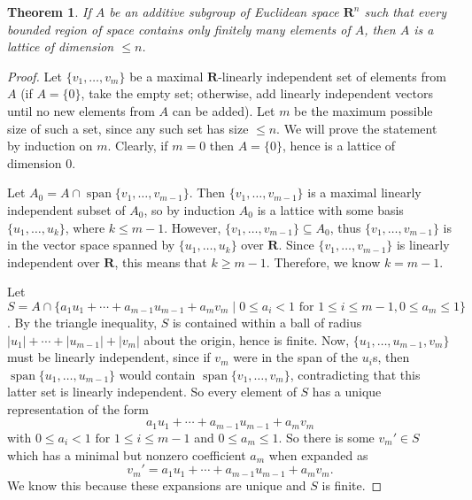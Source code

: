 \documentclass[10pt]{article}
\newcommand{\R}{\mathbf{R}}
\DeclareMathOperator*{\spn}{span}
\newtheorem*{thm}{Theorem}
\begin{document}
\begin{thm}
\normalfont
If $A$ be an additive subgroup of Euclidean space $\R^n$ such that every bounded region of space contains only finitely many elements of $A$, then $A$ is a lattice of dimension $\leq n$.
\end{thm}

\begin{proof}
Let $\{v_1, \dots , v_m\}$ be a maximal $\R$-linearly independent set of elements from $A$ (if $A=\{0\}$, take the empty set; otherwise, add linearly independent vectors until no new elements from $A$ can be added).  Let $m$ be the maximum possible size of such a set, since any such set has size $\leq n$.  We will prove the statement by induction on $m$.  Clearly, if $m = 0$ then $A = \{0\}$, hence is a lattice of dimension $0$.

Let $A_0 = A \cap \spn \{v_1, \dots , v_{m-1}\}$.  Then $\{v_1, \dots , v_{m-1}\}$ is a maximal linearly independent subset of $A_0$, so by induction $A_0$ is a lattice with some basis $\{u_1, \dots , u_k\}$, where $k \leq m-1$.  However, $\{v_1, \dots , v_{m-1}\} \subseteq A_0$, thus $\{v_1, \dots , v_{m-1}\}$ is in the vector space spanned by $\{u_1, \dots , u_k\}$ over $\R$.  Since $\{v_1, \dots , v_{m-1}\}$ is linearly independent over $\R$, this means that $k \geq m-1$.  Therefore, we know $k = m-1$.



Let $S = A \cap \{a_1u_1 + \cdots + a_{m-1}u_{m-1} + a_mv_m \mid 0 \leq a_i < 1 \text{ for } 1 \leq i \leq m-1, 0 \leq a_m \leq 1 \}$.  By the triangle inequality, $S$ is contained within a ball of radius $|u_1| + \cdots + |u_{m-1}| + |v_m|$ about the origin, hence is finite.  Now, $\{u_1, \dots , u_{m-1}, v_m\}$ must be linearly independent, since if $v_m$ were in the span of the $u_i$s, then $\spn\{u_1, \dots , u_{m-1}\}$ would contain $\spn\{v_1, \dots , v_m\}$, contradicting that this latter set is linearly independent.  So every element of $S$ has a unique representation of the form
$$
a_1u_1 + \cdots + a_{m-1}u_{m-1} + a_mv_m$$
with $0 \leq a_i < 1 \text{ for } 1 \leq i \leq m-1$ and $0 \leq a_m \leq 1$.  So there is some $v_m' \in S$ which has a minimal but nonzero coefficient $a_m$ when expanded as
$$
v_m' = a_1u_1 + \cdots + a_{m-1}u_{m-1} + a_mv_m.
$$
We know this because these expansions are unique and $S$ is finite.


\end{proof}
\end{document}
